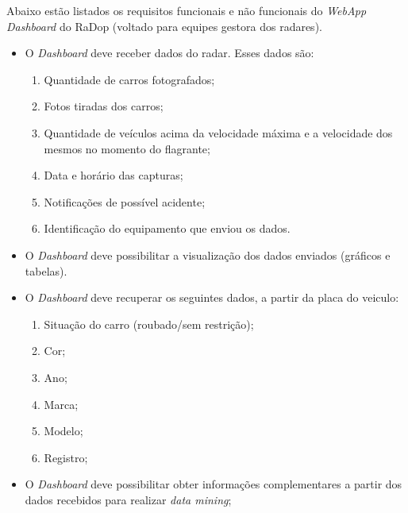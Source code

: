 Abaixo estão listados os requisitos funcionais e não funcionais do \textit{WebApp Dashboard} do RaDop (voltado para equipes gestora dos radares).

\begin{itemize}
    \item O \textit{Dashboard} deve receber dados do radar. Esses dados são:
    \begin{enumerate}
        \item Quantidade de carros fotografados;
        \item Fotos tiradas dos carros;
        \item Quantidade de veículos acima da velocidade máxima e a velocidade dos mesmos no momento do flagrante;
        \item Data e horário das capturas;
        \item Notificações de possível acidente;
        \item Identificação do equipamento que enviou os dados.
    \end{enumerate}
\end{itemize}

\begin{itemize}
    \item O \textit{Dashboard} deve possibilitar a visualização dos dados enviados (gráficos e tabelas).
\end{itemize}

\begin{itemize}
    \item O \textit{Dashboard} deve recuperar os seguintes dados, a partir da placa do veiculo:
    \begin{enumerate}
        \item Situação do carro (roubado/sem restrição);
        \item Cor;
        \item Ano;
        \item Marca;
        \item Modelo;
        \item Registro;
    \end{enumerate}
\end{itemize}

\begin{itemize}
    \item O \textit{Dashboard} deve possibilitar obter informações complementares a partir dos dados recebidos para realizar \textit{data mining}; 
\end{itemize}

